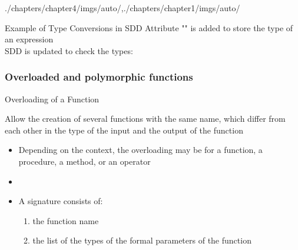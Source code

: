 \begin{graphicspathcontext}{{./chapters/chapter4/imgs/auto/},{./chapters/chapter1/imgs/auto/}}
\begin{bibunit}[apalike]
\begin{frame}{Example of Type Conversions in SDD}
	Attribute "" is added to store the type of an expression \\
	SDD is updated to check the types: \\
	\vspace{1em}
	\begin{sdd}
	\end{sdd}
\end{frame}

\subsubsection{Overloaded and polymorphic functions}
\subsubsectiontableofcontentslide

\begin{frame}{Overloading of a Function}
	\begin{definition}
		Allow the creation of several functions with the same name, which differ from each other in the type of the input and the output of the function
	\end{definition}
	\begin{itemize}
	\item Depending on the context, the overloading may be for a function, a procedure, a method, or an operator
	\vspace{.5cm}
	\item {}
	\vspace{.5cm}
	\item A signature consists of:
		\begin{enumerate}
		\item the function name
		\item the list of the types of the formal parameters of the function
		\end{enumerate}
	\end{itemize}
\end{frame}


\end{bibunit}
\end{graphicspathcontext}
